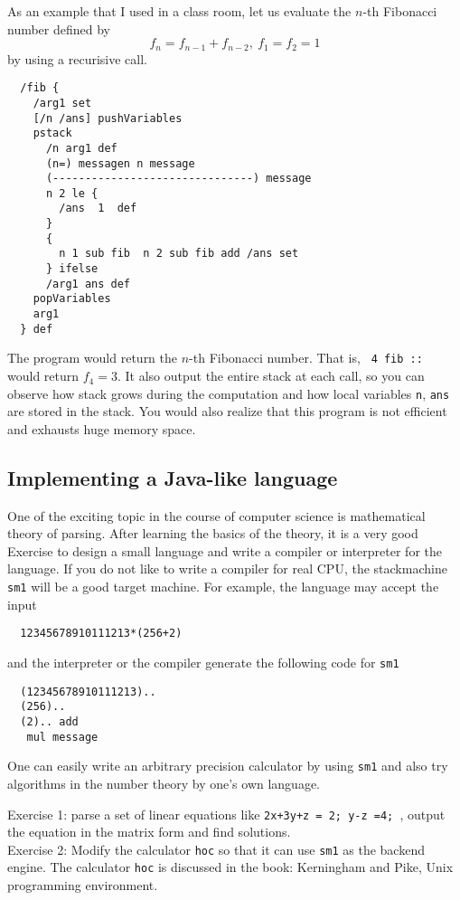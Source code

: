 \documentclass{article}
\begin{document}
As an example that I used in a class room, 
let us evaluate the $n$-th Fibonacci number
defined by
$$ f_n = f_{n-1}+f_{n-2}, \ f_1 = f_2 = 1 $$
by using a recurisive call.
\begin{verbatim}
  /fib {
    /arg1 set 
    [/n /ans] pushVariables
    pstack
      /n arg1 def
      (n=) messagen n message
      (-------------------------------) message
      n 2 le {
        /ans  1  def
      }
      {
        n 1 sub fib  n 2 sub fib add /ans set
      } ifelse
      /arg1 ans def
    popVariables
    arg1
  } def
\end{verbatim}
The program would return the $n$-th Fibonacci number.
That is,
\verb+ 4 fib :: +
would return $f_4=3$.
It also output the entire stack at each call,
so you can observe how stack grows during the computation
and how local variables {\tt n}, {\tt ans} are stored 
in the stack.
You would also realize that this program is not efficient
and exhausts huge memory space.


\subsection{Implementing  a Java-like language}

One of the exciting topic in the course of computer science
is mathematical theory of parsing.
After learning the basics of the theory,
it is a very good Exercise to design a small language and
write a compiler or interpreter for the language.
If you do not like to write a compiler for real CPU,
the stackmachine {\tt sm1} will be a good target
machine.
For example, the language may accept the input
\begin{verbatim}
  12345678910111213*(256+2)
\end{verbatim}
and the interpreter or the compiler generate the following code for {\tt sm1}
\begin{verbatim}
  (12345678910111213)..
  (256)..
  (2).. add
   mul message
\end{verbatim}
One can easily write an arbitrary precision calculator by using
{\tt sm1}
and also try algorithms in the number theory by one's own language.

\noindent
Exercise 1: parse a set of linear equations like
{\tt  2x+3y+z = 2; y-z =4; }, output the equation in the matrix form
and find solutions. \\
Exercise 2: 
Modify the calculator {\tt hoc} so that it can use {\tt sm1} as the
backend engine.
The calculator {\tt hoc} is discussed in the book:
Kerningham and Pike, Unix programming environment.
\end{document}

